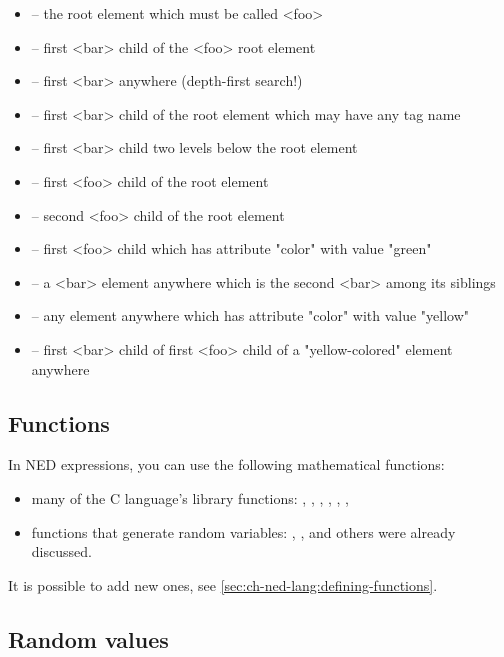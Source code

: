 \begin{itemize}
  \item {} -- the root element which must be called <foo>
  \item {} -- first <bar> child of the <foo> root element
  \item {} -- first <bar> anywhere (depth-first search!)
  \item {} -- first <bar> child of the root element which may have any tag name
  \item {} -- first <bar> child two levels below the root element
  \item {} -- first <foo> child of the root element
  \item {} -- second <foo> child of the root element
  \item {} -- first <foo> child which has attribute "color" with value "green"
  \item {} -- a <bar> element anywhere which is the second <bar> among its siblings
  \item \ttt{//*[@color='yellow']} -- any element anywhere which has attribute "color" with value "yellow"
  \item {} -- first <bar> child of first <foo> child of a "yellow-colored" element anywhere
\end{itemize}



\subsection{Functions}

In NED expressions, you can use the following mathematical functions:
\begin{itemize}
  \item{many of the C language's  library functions:
    , , , , ,
    , }
  \item{functions that generate random variables: ,
    ,  and others were already
    discussed.}
\end{itemize}

It is possible to add new ones, see \ref{sec:ch-ned-lang:defining-functions}.

\subsection{Random values}

